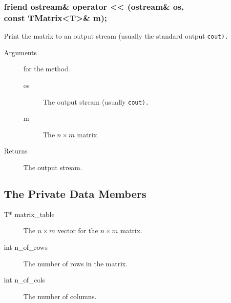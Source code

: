 \subsubsection{friend ostream\& operator << (ostream\& os, \\
                                            const TMatrix<T>\& m);}
Print the matrix to an output stream (usually the standard output \tt cout\rm).

\begin{description}
  \item[Arguments] for the method.
   \begin{description}
     \item [os] The output stream (usually \tt cout\rm).
     \item [m] The $n \times m$ matrix.
   \end{description} 
  \item [Returns] The output stream.
\end{description}

\subsection{The Private Data Members}

\begin{description}
  \item [T* matrix\_table] The $n \times m$ vector for the  
                           $n \times m$ matrix.
  \item [int n\_of\_rows] The number of rows in the matrix.
  \item [int n\_of\_cols] The number of columns.
\end{description}

